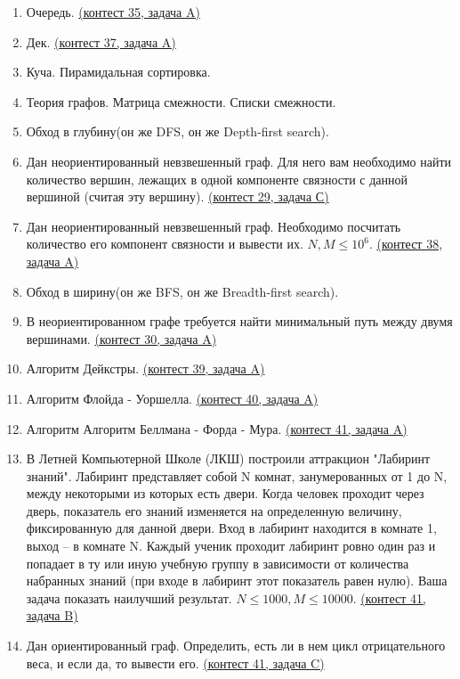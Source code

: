 \documentclass[a4paper,12pt]{article}
\begin{document}
\begin{enumerate}
\item Очередь. \href{https://informatics.msk.ru/mod/statements/view3.php?chapterid=57}{(контест 35, задача A)}
\item Дек. \href{https://informatics.msk.ru/mod/statements/view3.php?chapterid=60}{(контест 37, задача A)}
\item Куча. Пирамидальная сортировка.
\item Теория графов. Матрица смежности. Списки смежности.
\item Обход в глубину(он же DFS, он же Depth-first search).
\item Дан неориентированный невзвешенный граф. Для него вам необходимо найти количество вершин, лежащих в одной компоненте связности с данной вершиной (считая эту вершину). \href{https://informatics.msk.ru/mod/statements/view3.php?chapterid=165}{(контест 29, задача С)}
\item Дан неориентированный невзвешенный граф. Необходимо посчитать количество его компонент связности и вывести их. $N, M \le 10^6$. \href{https://informatics.msk.ru/mod/statements/view3.php?chapterid=111540}{(контест 38, задача A)}
\item Обход в ширину(он же BFS, он же Breadth-first search).
\item В неориентированном графе требуется найти минимальный путь между двумя вершинами. \href{https://informatics.msk.ru/mod/statements/view3.php?chapterid=160}{(контест 30, задача A)}
\item Алгоритм Дейкстры. \href{https://informatics.msk.ru/mod/statements/view3.php?chapterid=5}{(контест 39, задача A)}
\item Алгоритм Флойда - Уоршелла. \href{https://informatics.msk.ru/mod/statements/view3.php?chapterid=171}{(контест 40, задача A)}
\item Алгоритм Алгоритм Беллмана - Форда - Мура. \href{https://informatics.msk.ru/mod/statements/view3.php?chapterid=178}{(контест 41, задача A)}
\item В Летней Компьютерной Школе (ЛКШ) построили аттракцион "Лабиринт знаний". Лабиринт представляет собой N комнат, занумерованных от 1 до N, между некоторыми из которых есть двери. Когда человек проходит через дверь, показатель его знаний изменяется на определенную величину, фиксированную для данной двери. Вход в лабиринт находится в комнате 1, выход – в комнате N. Каждый ученик проходит лабиринт ровно один раз и попадает в ту или иную учебную группу в зависимости от количества набранных знаний (при входе в лабиринт этот показатель равен нулю). Ваша задача показать наилучший результат. $N \le 1000, M \le 10000$. \href{https://informatics.msk.ru/mod/statements/view3.php?chapterid=179}{(контест 41, задача B)}
\item Дан ориентированный граф. Определить, есть ли в нем цикл отрицательного веса, и если да, то вывести его. \href{https://informatics.msk.ru/mod/statements/view3.php?chapterid=180}{(контест 41, задача C)}
\end{enumerate}
\end{document}
